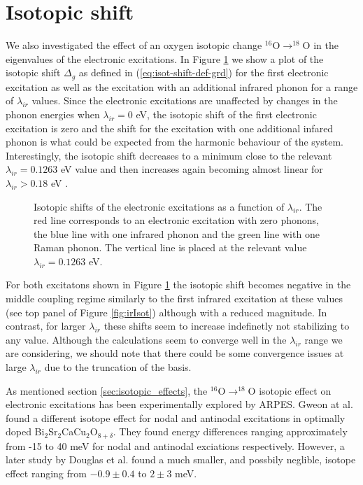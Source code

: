 \section{Isotopic shift}
\label{sec:elIsotShift}

We also investigated the effect of an oxygen isotopic change $^{16}$O$\rightarrow ^{18}$O in the eigenvalues of the electronic excitations.
In Figure \ref{fig:electrIsot} we show a plot of the isotopic shift $\Delta_g$ as defined in (\ref{eq:isot-shift-def-grd}) for the first electronic excitation as well as the excitation with an additional infrared phonon for a range of $\lambda_{ir}$ values.
Since the electronic excitations are unaffected by changes in the phonon energies when $\lambda_{ir}=0$ eV, the isotopic shift of the first electronic excitation is zero and the shift for the excitation with one additional infared phonon is what could be expected from the harmonic behaviour of the system.
Interestingly, the isotopic shift decreases to a minimum close to the relevant $\lambda_{ir}=0.1263$ eV value and then increases again becoming almost linear for $\lambda_{ir}>0.18$ eV \cite{GarciaSaraviaOrtizdeMontellano2014}.
%
\begin{figure}[ht]
  \centering
  
  \caption[Isotopic shift of the electronic excitations as a function of $\lambda_{ir}$.]
  {Isotopic shifts of the electronic excitations as a function of $\lambda_{ir}$. 
    The red line corresponds to an electronic excitation with zero phonons, the blue line with one infrared phonon and the green line with one Raman phonon.
    The vertical line is placed at the relevant value $\lambda_{ir}=0.1263$ eV.}
  \label{fig:electrIsot}
\end{figure}

For both excitatons shown in Figure \ref{fig:electrIsot} the isotopic shift becomes negative in the middle coupling regime similarly to the first infrared excitation at these values (see top panel of Figure \ref{fig:irIsot}) although with a reduced magnitude.
In contrast, for larger $\lambda_{ir}$ these shifts seem to increase indefinetly not stabilizing to any value.
Although the calculations seem to converge well in the $\lambda_{ir}$ range we are considering, we should note that there could be some convergence issues at large $\lambda_{ir}$ due to the truncation of the basis.

As mentioned section \ref{sec:isotopic_effects}, the $^{16}$O$\rightarrow ^{18}$O isotopic effect on electronic excitations has been experimentally explored by ARPES.
Gweon at al. \cite{Gweon2004} found a different isotope effect for nodal and antinodal excitations in optimally doped Bi$_2$Sr$_2$CaCu$_2$O$_{8+\delta}$. 
They found energy differences ranging approximately from -15 to 40 meV for nodal and antinodal exciations respectively.
However, a later study by Douglas et al. \cite{Douglas2007} found a much smaller, and possbily neglible, isotope effect ranging from $-0.9\pm 0.4$ to $2 \pm 3$ meV.

